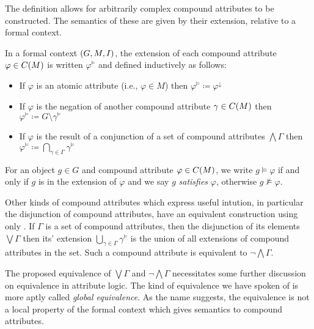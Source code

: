 The definition allows for arbitrarily complex compound attributes to be constructed.
The semantics of these are given by their extension, relative to a formal context.

\begin{definition}
	\label{definition:compound-attributes-semantics} 

	In a formal context $(G,M,\mathrel{I})$, the extension of each compound attribute $\varphi \in
		C(M)$ is written $\varphi^{\vDash}$ and defined inductively as follows:
	\begin{itemize}[itemsep=-0em]
		\item If $\varphi$ is an atomic attribute (i.e., $\varphi \in M$) then $\varphi
			      ^{\vDash}\coloneq \varphi^{\downarrow}$

		\item If $\varphi$ is the negation of another compound attribute $\gamma \in
			      C(M)$ then $\varphi^{\vDash}\coloneq G \setminus \gamma^{\vDash}$

		\item If $\varphi$ is the result of a conjunction of a set of compound attributes
		      $\bigwedge \Gamma$ then $\varphi^{\vDash}\coloneq \underset{\gamma \in \Gamma}
			      \bigcap \gamma^{\vDash}$
	\end{itemize}
	For an object $g\in G$ and compound attribute $\varphi \in C(M)$, we write
	$g \vDash \varphi$ if and only if $g$ is in the extension of $\varphi$ and we
	say $g$ \emph{satisfies} $\varphi$, otherwise $g \nvDash \varphi$.
\end{definition}

Other kinds of compound attributes which express useful intution, in particular the
disjunction of compound attributes, have an equivalent construction using only
. If $\Gamma$ is a set of compound attributes,
then the disjunction of its elements $\bigvee \Gamma$ then its' extension $\bigcup
	_{\gamma \in \Gamma}\gamma^{\vDash}$ is the union of all extensions of compound attributes
in the set. Such a compound attribute is equivalent to $\neg \bigwedge \Gamma$.

The proposed equivalence of $\bigvee \Gamma$ and $\neg \bigwedge \Gamma$
necessitates some further discussion on equivalence in attribute logic. The kind
of equivalence we have spoken of is more aptly called \textit{global equivalence}.
As the name suggests, the equivalence is not a local property of the formal
context which gives semantics to compound attributes.

